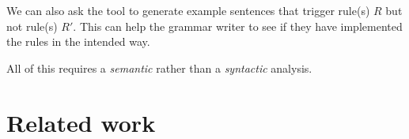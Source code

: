 We can also ask the tool to
generate example sentences that trigger rule(s) $R$ but not rule(s) $R'$. 
This can help the grammar writer to see
if they have implemented the rules in the intended way.

All of this requires a {\em semantic} rather than a {\em syntactic} analysis.









\section{Related work}
\label{sec:prev}


